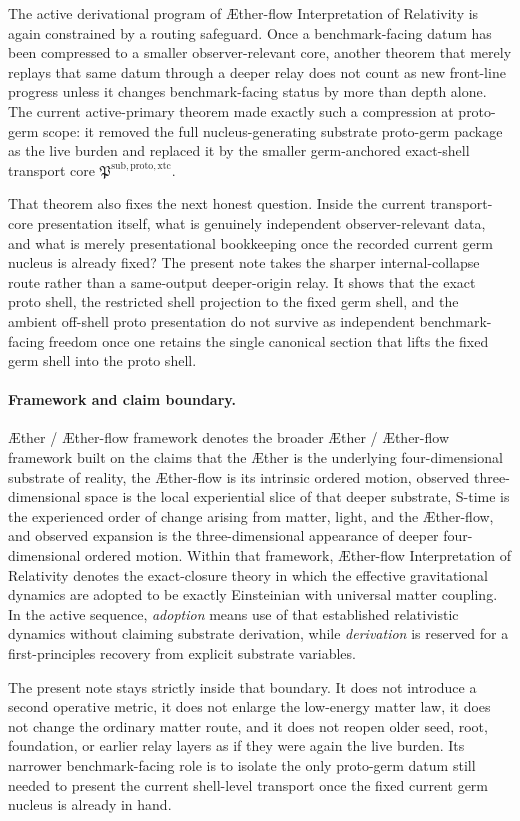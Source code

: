 \documentclass[11pt]{article}
\newcommand{\Aether}{\AE{}ther}
\newcommand{\Aflow}{\AE{}ther-flow}
\newcommand{\TheoryName}{\Aflow{} Interpretation of Relativity}
\newcommand{\TheoryProgram}{\Aether{} / \Aflow{} framework}
\newcommand{\ProtoTransportCore}{\mathfrak P^{\mathrm{sub,proto,xtc}}}
\begin{document}
The active derivational program of \TheoryName{} is again constrained by a routing safeguard. Once a benchmark-facing datum has been compressed to a smaller observer-relevant core, another theorem that merely replays that same datum through a deeper relay does not count as new front-line progress unless it changes benchmark-facing status by more than depth alone. The current active-primary theorem made exactly such a compression at proto-germ scope: it removed the full nucleus-generating substrate proto-germ package as the live burden and replaced it by the smaller germ-anchored exact-shell transport core \(\ProtoTransportCore\).

That theorem also fixes the next honest question. Inside the current transport-core presentation itself, what is genuinely independent observer-relevant data, and what is merely presentational bookkeeping once the recorded current germ nucleus is already fixed? The present note takes the sharper internal-collapse route rather than a same-output deeper-origin relay. It shows that the exact proto shell, the restricted shell projection to the fixed germ shell, and the ambient off-shell proto presentation do not survive as independent benchmark-facing freedom once one retains the single canonical section that lifts the fixed germ shell into the proto shell.

\paragraph{Framework and claim boundary.}
\TheoryProgram{} denotes the broader \Aether{} / \Aflow{} framework built on the claims that the \Aether{} is the underlying four-dimensional substrate of reality, the \Aflow{} is its intrinsic ordered motion, observed three-dimensional space is the local experiential slice of that deeper substrate, S-time is the experienced order of change arising from matter, light, and the \Aflow{}, and observed expansion is the three-dimensional appearance of deeper four-dimensional ordered motion. Within that framework, \TheoryName{} denotes the exact-closure theory in which the effective gravitational dynamics are adopted to be exactly Einsteinian with universal matter coupling. In the active sequence, \emph{adoption} means use of that established relativistic dynamics without claiming substrate derivation, while \emph{derivation} is reserved for a first-principles recovery from explicit substrate variables.

The present note stays strictly inside that boundary. It does not introduce a second operative metric, it does not enlarge the low-energy matter law, it does not change the ordinary matter route, and it does not reopen older seed, root, foundation, or earlier relay layers as if they were again the live burden. Its narrower benchmark-facing role is to isolate the only proto-germ datum still needed to present the current shell-level transport once the fixed current germ nucleus is already in hand.
\end{document}
